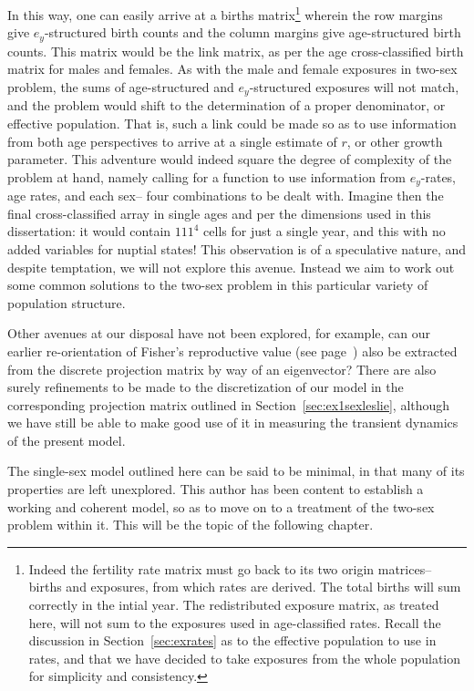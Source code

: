 In this
way, one can easily arrive at a births matrix\footnote{Indeed the fertility rate
matrix must go back to its two origin matrices-- births and exposures, from
which rates are derived. The total births will sum correctly in the intial
year. The redistributed exposure matrix, as treated here, will not sum to
the exposures used in age-classified rates. Recall the discussion in
Section~\ref{sec:exrates} as to the effective population to use in rates, and
that we have decided to take exposures from the whole population for simplicity
and consistency.} wherein the row margins give $e_y$-structured birth counts and
the column margins give age-structured birth counts. This matrix would be
the link matrix, as per the age cross-classified birth matrix for males and
females. As with the male and female exposures in two-sex problem, the sums of age-structured and
$e_y$-structured exposures will not match, and the problem would shift to the 
determination of a proper denominator, or effective population. That is, such a
link could be made so as to use information from both age perspectives to arrive
at a single estimate of $r$, or other growth parameter. This adventure would
indeed square the degree of complexity of the problem at hand, namely calling
for a function to use information from $e_y$-rates, age rates, and each sex-- four
combinations to be dealt with. Imagine then the final cross-classified array
in single ages and per the dimensions used in this dissertation: it would
contain $111^4$ cells for just a single year, and this with no added variables
for nuptial states! This observation is of a speculative nature, and despite
temptation, we will not explore this avenue. Instead we aim to work out some 
common solutions to the two-sex problem in this particular variety of population structure.

Other avenues at our disposal have not been explored, for example, can our
earlier re-orientation of Fisher's reproductive value (see page~\pageref{sec:fisher})
also be extracted from the discrete projection matrix by way of an eigenvector?
There are also surely refinements to be made to the discretization of our model
in the corresponding projection matrix outlined in
Section~\ref{sec:ex1sexleslie}, although we have still be able to make good use
of it in measuring the transient dynamics of the present model.

The single-sex model outlined here can be said to be minimal, in that many of
its properties are left unexplored. This author has been content to establish a
working and coherent model, so as to move on to a treatment of the two-sex
problem within it. This will be the topic of the following chapter.
